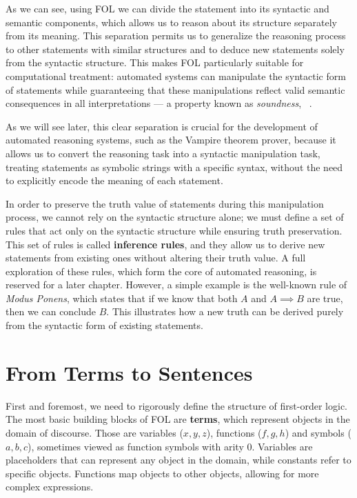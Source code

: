 As we can see, using FOL we can divide the statement into its syntactic and semantic components, which allows us to reason about its structure separately from its meaning.
This separation permits us to generalize the reasoning process to other statements with similar structures and to deduce new statements solely from the syntactic structure.
This makes FOL particularly suitable for computational treatment: automated systems can manipulate the syntactic form of statements while guaranteeing that these manipulations reflect valid semantic consequences in all interpretations — a property known as \emph{soundness}, \citeauthor{enderton2001}~\cite{enderton2001}.

As we will see later, this clear separation is crucial for the development of automated reasoning systems, such as the Vampire theorem prover, because it allows us to convert the reasoning task into a syntactic manipulation task, treating statements as symbolic strings with a specific syntax, without the need to explicitly encode the meaning of each statement.

In order to preserve the truth value of statements during this manipulation process, we cannot rely on the syntactic structure alone; we must define a set of rules that act only on the syntactic structure while ensuring truth preservation.
This set of rules is called \textbf{inference rules}, and they allow us to derive new statements from existing ones without altering their truth value.
A full exploration of these rules, which form the core of automated reasoning, is reserved for a later chapter. However, a simple example is the well-known rule of \emph{Modus Ponens}, which states that if we know that both \(A\) and \(A\implies B\) are true, then we can conclude \(B\). This illustrates how a new truth can be derived purely from the syntactic form of existing statements.

\section{From Terms to Sentences}

First and foremost, we need to rigorously define the structure of first-order logic.
The most basic building blocks of FOL are \textbf{terms}, which represent objects in the domain of discourse.
Those are variables (\(x,y,z\)), functions (\(f,g,h\)) and  symbols (\(a,b,c\)), sometimes viewed as function symbols with arity 0.
Variables are placeholders that can represent any object in the domain, while constants refer to specific objects. Functions map objects to other objects, allowing for more complex expressions.

